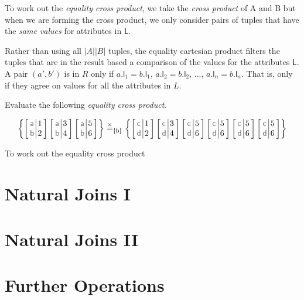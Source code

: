 To work out the \textit{equality cross product}, 
we take the \textit{cross product} of A and B but when we are forming the cross product, 
we only consider pairs of tuples that have the \textit{same values} for attributes in $\textsf{L}$. 



Rather than using all $|A||B|$ tuples, the equality cartesian product filters 
the tuples that are in the result based a comparison of the values for the attributes 
$\textsf{L}$. A pair $(a',b')$ is in $R$ only if 
$a\textsf{.l}_1 = b\textsf{.l}_1$, $a\textsf{.l}_2 = b\textsf{.l}_2$, ..., 
$a\textsf{.l}_n = b\textsf{.l}_n$. That is, only if they agree on values 
for all the attributes in $L$. 

\frmrule

\begin{example}
Evaluate the following \textit{equality cross product}.

$$\arraycolsep=2pt
\left\{
\ratuple {
    \textsf{a} & 1 \\
    \textsf{b} & 2
}
\ratuple {
     \textsf{a} & 3 \\
     \textsf{b} & 4
}
\ratuple {
     \textsf{a} & 5 \\
     \textsf{b} & 6
}
\right\}
\overset{\times}{=}_{\textsf{\{b\}}}
\left\{
\ratuple {
     \textsf{c} & 1 \\
     \textsf{d} & 2
}
\ratuple {
     \textsf{c} & 3 \\
     \textsf{d} & 4
}
\ratuple {
     \textsf{c} & 5 \\
     \textsf{d} & 6
}
\ratuple {
     \textsf{c} & 5 \\
     \textsf{d} & 6
}
\ratuple {
     \textsf{c} & 5 \\
     \textsf{d} & 6
}
\ratuple {
     \textsf{c} & 5 \\
     \textsf{d} & 6
}
\right\}
$$


\end{example}




To work out the equality cross product




\section{Natural Joins I}





\section{Natural Joins II}


\section{Further Operations}



